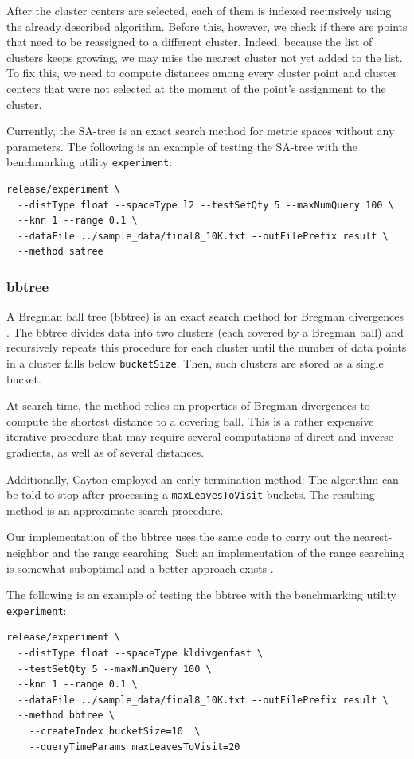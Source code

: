 \documentclass[runningheads,a4paper]{llncs}
\newcommand{\ttt}[1]{\texttt{#1}}
\begin{document}
{After the cluster centers are selected, each of them is indexed recursively using the already described
algorithm. Before this, however, we check  if there are points that need to be reassigned to a different cluster.
Indeed, because the list of clusters keeps growing, we may miss the nearest cluster not yet
added to the list. To fix this, we need  to compute distances among every cluster point
and cluster centers that were not selected at the moment of the point's assignment to the cluster.

Currently, the SA-tree is an exact search method for metric spaces without any parameters.
The following is an example of testing the SA-tree with the benchmarking utility \ttt{experiment}:
{
\footnotesize
\begin{verbatim}
release/experiment \
  --distType float --spaceType l2 --testSetQty 5 --maxNumQuery 100 \
  --knn 1 --range 0.1 \
  --dataFile ../sample_data/final8_10K.txt --outFilePrefix result \
  --method satree 
\end{verbatim}
}

\subsubsection{bbtree}
A Bregman ball tree (bbtree) is an exact search method for Bregman divergences \cite{Cayton2008}.
The bbtree divides data into two clusters (each covered by a Bregman ball)
and recursively repeats this procedure for each cluster until the number of data points
in a cluster falls below \ttt{bucketSize}. Then, such clusters are stored as a single bucket.

At search time, the method relies on properties of Bregman divergences 
to compute the shortest distance to a covering ball. 
This is a rather expensive iterative procedure that 
may require several computations of direct and inverse gradients,
as well as of several distances.

Additionally, Cayton  \cite{Cayton2008} employed an early termination method:
The algorithm  can be told to stop after processing
a \ttt{maxLeavesToVisit} buckets.
The resulting method is an approximate search procedure.

Our implementation of the bbtree uses the same code to carry
out the nearest-neighbor and
the range searching. 
Such an implementation of the range searching is somewhat suboptimal
and a better approach exists \cite{cayton2009efficient}.

The following is an example of testing the bbtree with the benchmarking utility \ttt{experiment}:
{
\footnotesize
\begin{verbatim}
release/experiment \
  --distType float --spaceType kldivgenfast \
  --testSetQty 5 --maxNumQuery 100 \
  --knn 1 --range 0.1 \
  --dataFile ../sample_data/final8_10K.txt --outFilePrefix result \
  --method bbtree \
    --createIndex bucketSize=10  \
    --queryTimeParams maxLeavesToVisit=20 
\end{verbatim}
}

}
\end{document}
